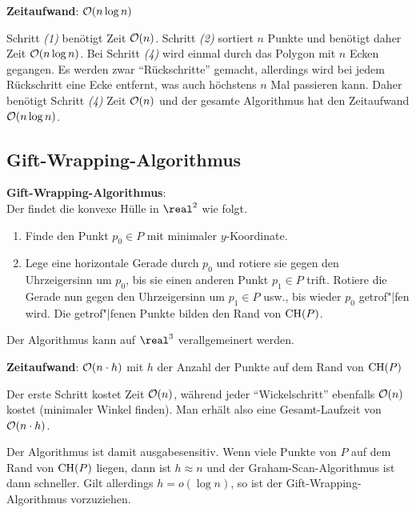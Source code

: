 \linie

\textbf{Zeitaufwand}:
$\mathcal{O}(n \log n)$

\begin{Beweis}
    Schritt \emph{(1)} benötigt Zeit $\mathcal{O}(n)$.
    Schritt \emph{(2)} sortiert $n$ Punkte und benötigt daher Zeit $\mathcal{O}(n \log n)$.
    Bei Schritt \emph{(4)} wird einmal durch das Polygon mit $n$ Ecken gegangen.
    Es werden zwar "`Rückschritte"' gemacht, allerdings wird bei jedem Rückschritt eine Ecke
    entfernt, was auch höchstens $n$ Mal passieren kann.
    Daher benötigt Schritt \emph{(4)} Zeit $\mathcal{O}(n)$ und der gesamte Algorithmus hat den
    Zeitaufwand $\mathcal{O}(n \log n)$.
\end{Beweis}

\pagebreak

\subsection{%
    Gift-Wrapping-Algorithmus%
}

\textbf{Gift-Wrapping-Algorithmus}:\\
Der  findet die konvexe Hülle in $\real^2$ wie folgt.
\begin{enumerate}
    \item
    Finde den Punkt $p_0 \in P$ mit minimaler $y$-Koordinate.

    \item
    Lege eine horizontale Gerade durch $p_0$ und rotiere sie gegen den Uhrzeigersinn um $p_0$,
    bis sie einen anderen Punkt $p_1 \in P$ trift.
    Rotiere die Gerade nun gegen den Uhrzeigersinn um $p_1 \in P$ usw.,
    bis wieder $p_0$ getrof"|fen wird.
    Die getrof"|fenen Punkte bilden den Rand von $\operatorname{CH}(P)$.
\end{enumerate}
Der Algorithmus kann auf $\real^3$ verallgemeinert werden.

\linie

\textbf{Zeitaufwand}:
$\mathcal{O}(n \cdot h)$ mit $h$ der Anzahl der Punkte auf dem Rand von $\operatorname{CH}(P)$

\begin{Beweis}
    Der erste Schritt kostet Zeit $\mathcal{O}(n)$,
    während jeder "`Wickelschritt"' ebenfalls $\mathcal{O}(n)$ kostet (minimaler Winkel finden).
    Man erhält also eine Gesamt-Laufzeit von $\mathcal{O}(n \cdot h)$.
\end{Beweis}

Der Algorithmus ist damit ausgabesensitiv.
Wenn viele Punkte von $P$ auf dem Rand von $\operatorname{CH}(P)$ liegen, dann ist $h \approx n$ und
der Graham-Scan-Algorithmus ist dann schneller.
Gilt allerdings $h = o(\log n)$, so ist der Gift-Wrapping-Algorithmus vorzuziehen.

